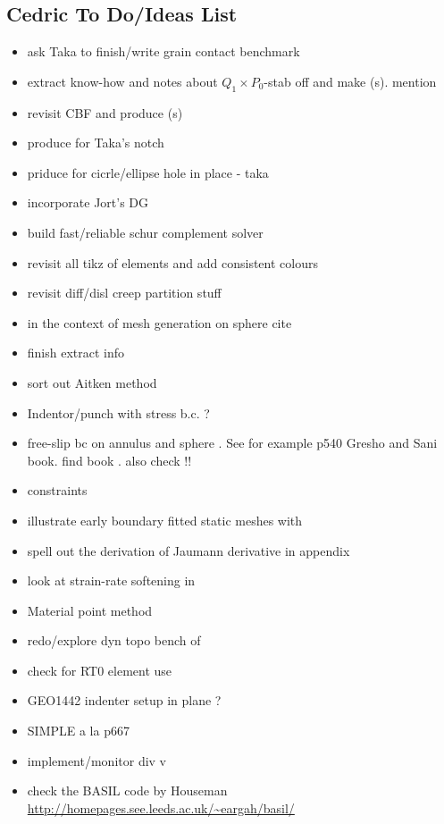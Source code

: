\subsection{Cedric To Do/Ideas List}

\begin{itemize}
\item ask Taka to finish/write grain contact benchmark
\item extract know-how and notes about $Q_1 \times P_0$-stab off \elefant and 
make \stone(s). mention \cite{lisi12}
\item revisit CBF and produce \stone(s)
\item produce \stone for Taka's notch
\item priduce \stone for cicrle/ellipse hole in place - taka
\item incorporate Jort's DG 
\item build fast/reliable schur complement solver
\item revisit all tikz of elements and add consistent colours
\item revisit diff/disl creep partition stuff
\item in the context of mesh generation on sphere cite \cite{moma19}
\item finish extract info 
\item sort out Aitken method
\item Indentor/punch with stress b.c. ?
\item free-slip bc on annulus and sphere . See for example p540 Gresho and Sani book. find book \cite{deab72}.
also check \cite{ensg82} !!
\item constraints \cite{absh79}
\item illustrate early boundary fitted static meshes with \cite{thar85}
\item \cite{bepo10} spell out the derivation of Jaumann derivative in appendix
\item look at strain-rate softening in \cite{belz02}
\item Material point method \cite{sucs94,susc96,susp07}
\item redo/explore dyn topo bench of \cite{bore19}
\item check \cite{bufm19} for RT0 element use
\item GEO1442 indenter setup in plane ?
\item SIMPLE a la p667 \cite{john16} 
\item implement/monitor div v
\item check the BASIL code by Houseman \etal \url{http://homepages.see.leeds.ac.uk/~eargah/basil/}

\end{itemize}
